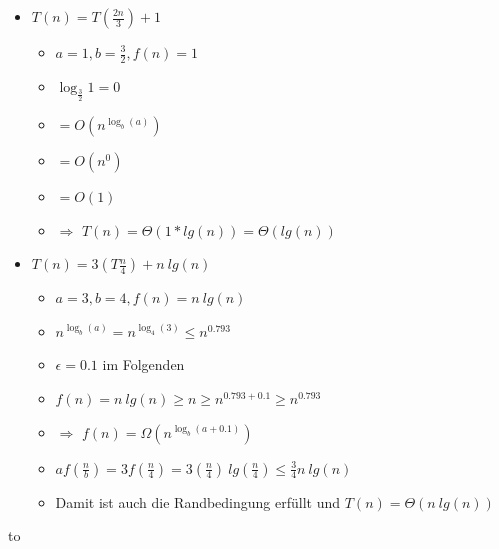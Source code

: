 \documentclass[
    ngerman,
    color=3b,
    load_common, %
    summary,
    boxarc,
]{tuda_summary}
\begin{document}
\begin{itemize}
\begin{itemize}
\begin{itemize}
                        \item \textit{$T(n) = T(\frac{2n}{3}) + 1$}
                              \begin{itemize}
                                  \item $a=1, b= \frac{3}{2}, f(n) = 1$
                                  \item $\log_{\frac{3}{2}} 1 = 0$
                                  \item {} $= O(n^{\log_b(a)})$
                                  \item[] {\makebox[1.5cm][l]{}} $= O(n^0)$
                                  \item[] {\makebox[1.5cm][l]{}} $= O(1)$
                                  \item {} $\Rightarrow$ $T(n) = \Theta(1 * lg(n)) = \Theta(lg(n))$
                              \end{itemize}

                        \item \textit{$T(n) = 3(T\frac{n}{4}) + n~lg(n)$}
                              \begin{itemize}
                                  \item $a=3,b=4,f(n)= n~lg(n)$
                                  \item $n^{\log_b(a)} = n^{\log_4(3)} \leq n^{0.793}$
                                  \item $\epsilon = 0.1$ im Folgenden
                                  \item $f(n) = n~lg(n) \geq n \geq n^{0.793 + 0.1} \geq n^{0.793}$
                                  \item {} $\Rightarrow$ $f(n) = \Omega(n^{\log_b(a+0.1)})$
                                  \item $a f(\frac{n}{b}) = 3f(\frac{n}{4}) = 3(\frac{n}{4})~lg(\frac{n}{4}) \leq \frac{3}{4} n~lg(n)$
                                  \item Damit ist auch die Randbedingung erfüllt und $T(n) = \Theta(n~lg(n))$

                              \end{itemize}
                    \end{itemize}
          \end{itemize}

\end{itemize}
\hbox to 
\end{document}
